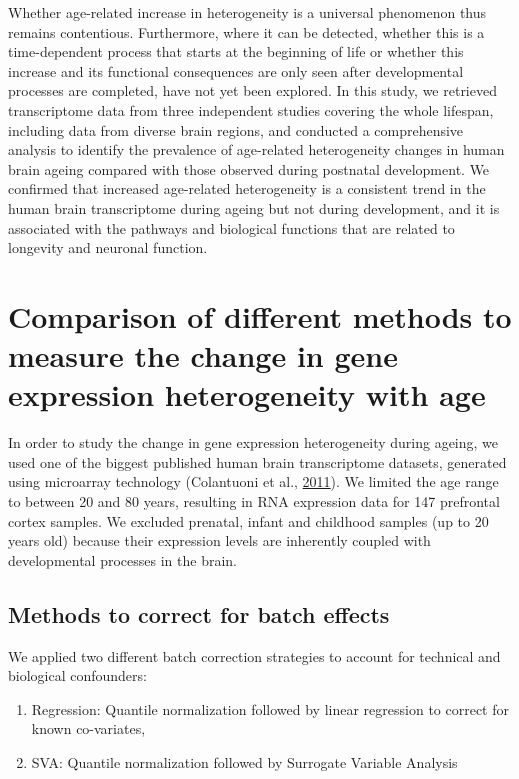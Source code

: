 \documentclass[12pt,twoside]{unicam}
\providecommand{\tightlist}{%
  \setlength{\itemsep}{0pt}\setlength{\parskip}{0pt}}
\begin{document}
Whether age-related increase in heterogeneity is a universal phenomenon thus remains contentious. Furthermore, where it can be detected, whether this is a time-dependent process that starts at the beginning of life or whether this increase and its functional consequences are only seen after developmental processes are completed, have not yet been explored. In this study, we retrieved transcriptome data from three independent studies covering the whole lifespan, including data from diverse brain regions, and conducted a comprehensive analysis to identify the prevalence of age-related heterogeneity changes in human brain ageing compared with those observed during postnatal development. We confirmed that increased age-related heterogeneity is a consistent trend in the human brain transcriptome during ageing but not during development, and it is associated with the pathways and biological functions that are related to longevity and neuronal function.

\hypertarget{veronikaresults}{%
\section{Comparison of different methods to measure the change in gene expression heterogeneity with age}\label{veronikaresults}}

In order to study the change in gene expression heterogeneity during ageing, we used one of the biggest published human brain transcriptome datasets, generated using microarray technology (Colantuoni et al., \protect\hyperlink{ref-Colantuoni2011}{2011}). We limited the age range to between 20 and 80 years, resulting in RNA expression data for 147 prefrontal cortex samples. We excluded prenatal, infant and childhood samples (up to 20 years old) because their expression levels are inherently coupled with developmental processes in the brain.

\hypertarget{methods-to-correct-for-batch-effects}{%
\subsection{Methods to correct for batch effects}\label{methods-to-correct-for-batch-effects}}

We applied two different batch correction strategies to account for technical and biological confounders:

\begin{enumerate}
\def\labelenumi{\arabic{enumi}.}
\tightlist
\item
  Regression: Quantile normalization followed by linear regression to correct for known co-variates,
\item
  SVA: Quantile normalization followed by Surrogate Variable Analysis
\end{enumerate}
\end{document}
